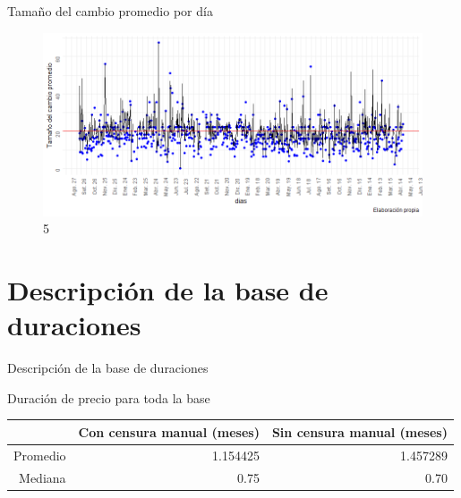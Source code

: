 \documentclass[xcolor=dvipsnames]{beamer}
\begin{document}

\begin{frame}
Tamaño del cambio promedio por d\'ia
\begin{figure}
\includegraphics[scale=0.50]{tamano_cambio_promedio.png}
\caption{5}
\end{figure}
\end{frame}


\section{Descripci\'on de la base de duraciones}

\begin{frame}
Descripci\'on de la base de duraciones
\end{frame}


\begin{frame}
Duraci\'on de precio para toda la base
\centering
\begin{tabular}{rrr}
\toprule
 & Con censura manual (meses) & Sin censura manual (meses)\\
\midrule
Promedio &1.154425  &1.457289  \\ Mediana & 0.75 & 0.70\\
\bottomrule
\end{tabular}
\end{frame}
\end{document}
